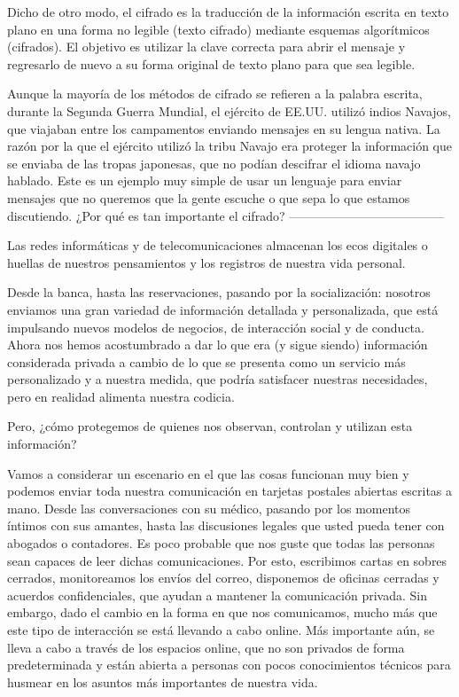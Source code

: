 \documentclass[10pt,a5paper,twoside,,]{book}
\begin{document}
Dicho de otro modo, el cifrado es la traducción de la información
escrita en texto plano en una forma no legible (texto cifrado) mediante
esquemas algorítmicos (cifrados). El objetivo es utilizar la clave
correcta para abrir el mensaje y regresarlo de nuevo a su forma original
de texto plano para que sea legible.

Aunque la mayoría de los métodos de cifrado se refieren a la palabra
escrita, durante la Segunda Guerra Mundial, el ejército de EE.UU.
utilizó indios Navajos, que viajaban entre los campamentos enviando
mensajes en su lengua nativa. La razón por la que el ejército utilizó la
tribu Navajo era proteger la información que se enviaba de las tropas
japonesas, que no podían descifrar el idioma navajo hablado. Este es un
ejemplo muy simple de usar un lenguaje para enviar mensajes que no
queremos que la gente escuche o que sepa lo que estamos discutiendo.
¿Por qué es tan importante el cifrado?
--------------------------------------

Las redes informáticas y de telecomunicaciones almacenan los ecos
digitales o huellas de nuestros pensamientos y los registros de nuestra
vida personal.

Desde la banca, hasta las reservaciones, pasando por la socialización:
nosotros enviamos una gran variedad de información detallada y
personalizada, que está impulsando nuevos modelos de negocios, de
interacción social y de conducta. Ahora nos hemos acostumbrado a dar lo
que era (y sigue siendo) información considerada privada a cambio de lo
que se presenta como un servicio más personalizado y a nuestra medida,
que podría satisfacer nuestras necesidades, pero en realidad alimenta
nuestra codicia.

Pero, ¿cómo protegemos de quienes nos observan, controlan y utilizan
esta información?

Vamos a considerar un escenario en el que las cosas funcionan muy bien y
podemos enviar toda nuestra comunicación en tarjetas postales abiertas
escritas a mano. Desde las conversaciones con su médico, pasando por los
momentos íntimos con sus amantes, hasta las discusiones legales que
usted pueda tener con abogados o contadores. Es poco probable que nos
guste que todas las personas sean capaces de leer dichas comunicaciones.
Por esto, escribimos cartas en sobres cerrados, monitoreamos los envíos
del correo, disponemos de oficinas cerradas y acuerdos confidenciales,
que ayudan a mantener la comunicación privada. Sin embargo, dado el
cambio en la forma en que nos comunicamos, mucho más que este tipo de
interacción se está llevando a cabo online. Más importante aún, se lleva
a cabo a través de los espacios online, que no son privados de forma
predeterminada y están abierta a personas con pocos conocimientos
técnicos para husmear en los asuntos más importantes de nuestra vida.
\end{document}
